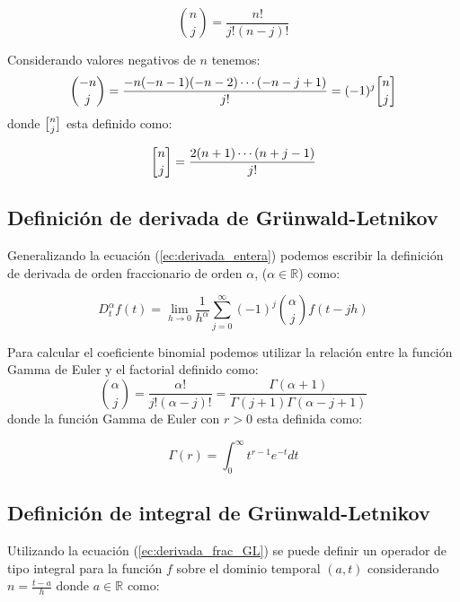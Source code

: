 	\begin{equation}
		\binom{n}{j} = \frac{n!}{j! (n-j)! } 
	\end{equation}
			
	Considerando valores negativos de $n$ tenemos:
	\begin{equation}
		\binom{-n}{j} = \frac{-n(-n-1)(-n-2) \cdots (-n -j +1 )}{j!}= (-1)^{j} \binomb{n}{j}
		\label{ec:binomio_n}
	\end{equation}
	donde $\binomb{n}{j}$ esta definido como:
			
	\begin{equation}
		\binomb{n}{j} = \frac{2(n+1) \cdots (n+j-1)}{j!}
	\end{equation}
	
		\subsection{Definición de derivada de Grünwald-Letnikov}
		
	Generalizando la ecuación (\ref{ec:derivada_entera}) podemos escribir la definición de derivada de orden fraccionario de orden  $\alpha$, ($\alpha \in \mathbb{R}$) como:
		
	\begin{equation}
		D^{\alpha}_{t} f(t) = \lim_{h \to 0} \frac{1}{h^{\alpha}}   \sum_{j = 0}^{\infty} (-1)^{j} \binom{\alpha}{j} f(t - jh)
		\label{ec:derivada_frac_GL}
	\end{equation}
			
	Para calcular el coeficiente binomial podemos utilizar la relación entre la función Gamma de Euler y el factorial definido como:
	\begin{equation}
		\binom{\alpha}{j}  = \frac{\alpha!}{j! (\alpha-j)!} = \frac{\Gamma (\alpha + 1)}{\Gamma(j+1) \Gamma(\alpha - j + 1)}
	\end{equation}
	donde la función Gamma de Euler con $r>0$ esta definida como:
			
	\begin{equation}
		\Gamma(r) = \int^{\infty}_{0} t^{r-1} e^{-t}dt
	\end{equation}
			
		\subsection{Definición de integral de Grünwald-Letnikov}
		
	Utilizando la ecuación (\ref{ec:derivada_frac_GL}) se puede definir un operador de tipo integral para la función $f$  sobre el dominio temporal $(a,t)$ considerando $n = \frac{t-a}{h}$ donde $a \in \mathbb{R}$ como:
			
